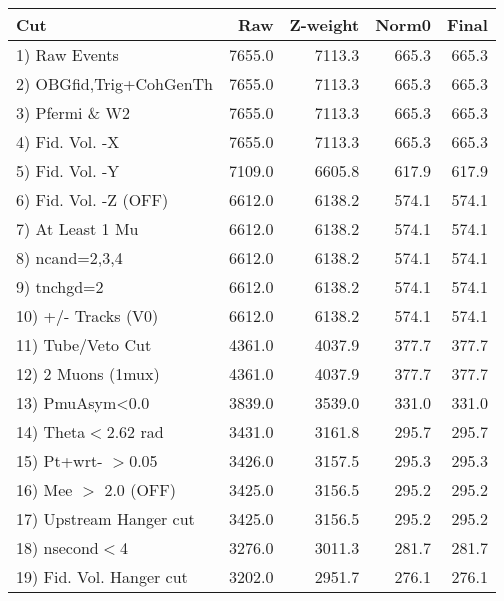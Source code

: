  \begin{table}[h!]\centering
 \begin{tabular}{||l||r|r|r|r||}
 \hline
 \hline
 Cut & Raw & Z-weight & Norm0 & Final \\
 \hline
  1) Raw Events           &      7655.0 &      7113.3 &       665.3 &       665.3 \\
  2) OBGfid,Trig+CohGenTh &      7655.0 &      7113.3 &       665.3 &       665.3 \\
  3) Pfermi \& W2         &      7655.0 &      7113.3 &       665.3 &       665.3 \\
  4) Fid. Vol. -X         &      7655.0 &      7113.3 &       665.3 &       665.3 \\
  5) Fid. Vol. -Y         &      7109.0 &      6605.8 &       617.9 &       617.9 \\
  6) Fid. Vol. -Z (OFF)   &      6612.0 &      6138.2 &       574.1 &       574.1 \\
  7) At Least 1 Mu        &      6612.0 &      6138.2 &       574.1 &       574.1 \\
  8) ncand=2,3,4          &      6612.0 &      6138.2 &       574.1 &       574.1 \\
  9) tnchgd=2             &      6612.0 &      6138.2 &       574.1 &       574.1 \\
 10) +/- Tracks (V0)      &      6612.0 &      6138.2 &       574.1 &       574.1 \\
 11) Tube/Veto Cut        &      4361.0 &      4037.9 &       377.7 &       377.7 \\
 12) 2 Muons (1mux)       &      4361.0 &      4037.9 &       377.7 &       377.7 \\
 13) PmuAsym<0.0          &      3839.0 &      3539.0 &       331.0 &       331.0 \\
 14) Theta$<$2.62 rad     &      3431.0 &      3161.8 &       295.7 &       295.7 \\
 15) Pt+wrt- $>$0.05      &      3426.0 &      3157.5 &       295.3 &       295.3 \\
 16) Mee $>$ 2.0  (OFF)   &      3425.0 &      3156.5 &       295.2 &       295.2 \\
 17) Upstream Hanger cut  &      3425.0 &      3156.5 &       295.2 &       295.2 \\
 18) nsecond$<$4          &      3276.0 &      3011.3 &       281.7 &       281.7 \\
 19) Fid. Vol. Hanger cut &      3202.0 &      2951.7 &       276.1 &       276.1 \\

\end{tabular}
\end{table}

